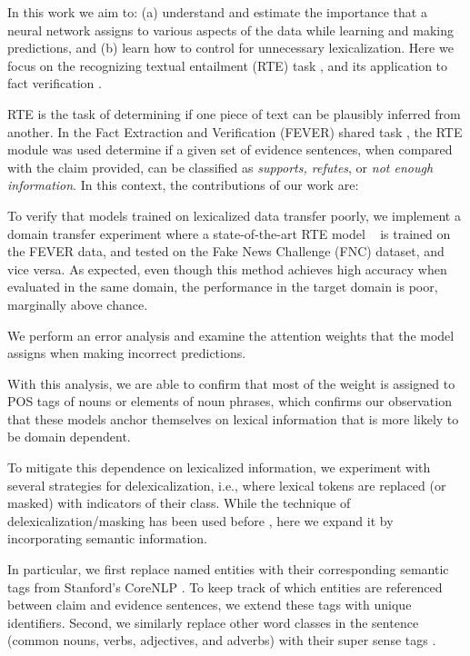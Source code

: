 \documentclass[11pt,a4paper]{article}
\begin{document}
In this work we aim to: (a) understand and estimate the importance that a neural network assigns to various aspects of the data while learning and making predictions, and (b) learn how to control for unnecessary lexicalization. Here we focus on the recognizing textual entailment (RTE) task \citep{dagan2013recognizing}, and its application to fact verification \citep{thorne2018fever, pomerleau2017fake}.

RTE is the task of determining if one piece of text can be plausibly inferred from another. In the Fact Extraction and Verification (FEVER) shared task \cite{thorne2018fever}, the RTE module was used determine if a given set of evidence sentences, when compared with the claim provided, can be classified as \textit{supports, refutes}, or \textit{not enough information}.
In this context, the contributions of our work are:

{} To verify that models trained on lexicalized data transfer poorly, we implement a domain transfer experiment where a state-of-the-art RTE model ~\cite{parikh2016decomposable}  is trained on the FEVER data, and tested on the Fake News Challenge (FNC) \citep{pomerleau2017fake} 
dataset, and vice versa. As expected, even though this method achieves high accuracy when evaluated in the same domain, the performance in the target domain is poor, marginally above chance.
 
 
 {} We perform an error analysis and examine the attention weights that the model  assigns when making incorrect predictions.
 
 With this analysis, we are able to confirm that most of the weight is assigned to POS tags of nouns or elements of noun phrases, which confirms our observation that these models anchor themselves on lexical information that is more likely to be domain dependent. 
 
{} To mitigate this dependence on lexicalized information, we experiment with several strategies for delexicalization, i.e., where lexical tokens are replaced (or masked) with indicators of their class. While the technique of delexicalization/masking has been used before \citep[e.g.,]{zeman2008cross}, here we expand it by incorporating semantic information. 



 
In particular, we first replace named entities with their corresponding semantic tags from Stanford's CoreNLP \citep{manning2014stanford}. 
To keep track of which entities are referenced between claim and evidence sentences, we extend these tags with unique identifiers. 
%
Second, we similarly replace other word classes in the sentence (common nouns, verbs, adjectives, and adverbs)  with their super sense tags \citep{ciaramita2003supersense}.
\end{document}
